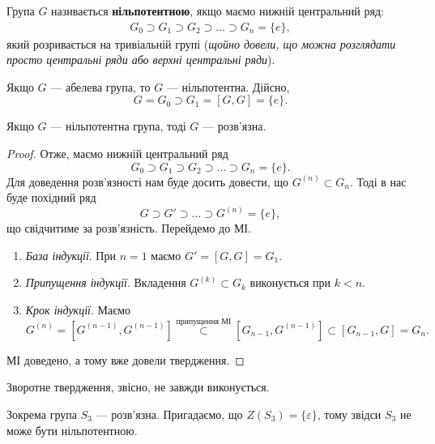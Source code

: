 \documentclass{math_library}
\begin{document}
\begin{definition}
Група $G$ називається \textbf{нільпотентною}, якщо маємо нижній центральний ряд:
\begin{align*}
G_0 \supset G_1 \supset G_2 \supset \dots \supset G_n = \{e\},
\end{align*}
який розривається на тривіальній групі (\textit{щойно довели, що можна розглядати просто центральні ряди або верхні центральні ряди}).
\end{definition}

\begin{remark}
Якщо $G$ --- абелева група, то $G$ --- нільпотентна. Дійсно, 
\[
G = G_0 \supset G_1 = [G,G] = \{e\}.
\]
\end{remark}

\begin{proposition}
Якщо $G$ --- нільпотентна група, тоді $G$ --- розв'язна. 
\end{proposition}

\begin{proof}
Отже, маємо нижній центральний ряд 
\[
G_0 \supset G_1 \supset G_2 \supset \dots \supset G_n = \{e\}.
\]
Для доведення розв'язності нам буде досить довести, що $G^{(n)} \subset G_n$. Тоді в нас буде похідний ряд 
\[
G \supset G' \supset \dots \supset G^{(n)} = \{e\},
\]
що свідчитиме за розв'язність. Перейдемо до МІ.
\begin{enumerate}[nosep,wide=0pt,label={\Roman*.}]
\item \textit{База індукції}. При $n = 1$ маємо $G' = [G,G] = G_1$.

\item \textit{Припущення індукції}. Вкладення $G^{(k)} \subset G_k$ виконується при $k < n$.

\item \textit{Крок індукції}. Маємо 
\[
G^{(n)} = [G^{(n-1)},G^{(n-1)}] \overset{\text{припущення МІ}}{\subset} [G_{n-1}, G^{(n-1)}] \subset [G_{n-1}, G] = G_n.
\]
\end{enumerate}
МІ доведено, а тому вже довели твердження.
\end{proof}

\begin{remark}
Зворотне твердження, звісно, не завжди виконується.
\end{remark}

\begin{example}
Зокрема група $S_3$ --- розв'язна. Пригадаємо, що $Z(S_3) = \{\varepsilon\}$, тому звідси $S_3$ не може бути нільпотентною.
\end{example}
\end{document}
